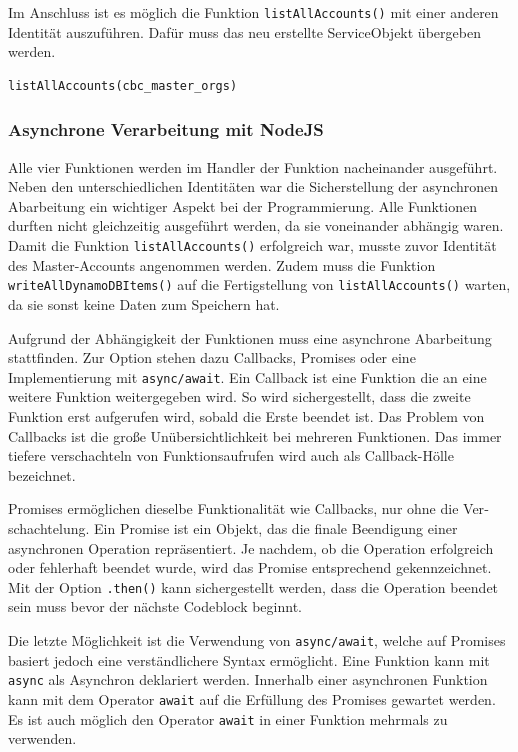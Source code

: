 Im Anschluss ist es möglich die Funktion \verb+listAllAccounts()+ mit einer anderen Identität auszuführen.
Dafür muss das neu erstellte ServiceObjekt übergeben werden.

\begin{lstlisting}[basicstyle=\ttfamily\small, breaklines=true , frame = single, backgroundcolor=\color{lightgray} ]
listAllAccounts(cbc_master_orgs)
\end{lstlisting}

\subsubsection{Asynchrone Verarbeitung mit NodeJS}

Alle vier Funktionen werden im Handler der Funktion nacheinander ausgeführt.
Neben den unterschiedlichen Identitäten war die Sicherstellung der asynchronen Abarbeitung ein wichtiger Aspekt bei der Programmierung.
Alle Funktionen durften nicht gleichzeitig ausgeführt werden, da sie voneinander abhängig waren.
Damit die Funktion \verb+listAllAccounts()+ erfolgreich war, musste zuvor Identität des Master-Accounts angenommen werden.
Zudem muss die Funktion \verb+writeAllDynamoDBItems()+ auf die Fertigstellung von \verb+listAllAccounts()+ warten, da sie sonst keine Daten zum Speichern hat.

Aufgrund der Abhängigkeit der Funktionen muss eine asynchrone Abarbeitung stattfinden.
Zur Option stehen dazu Callbacks, Promises oder eine Implementierung mit \verb+async/await+.
Ein Callback ist eine Funktion die an eine weitere Funktion weitergegeben wird.
So wird sichergestellt, dass die zweite Funktion erst aufgerufen wird, sobald die Erste beendet ist.
Das Problem von Callbacks ist die große Unübersichtlichkeit bei mehreren Funktionen.
Das immer tiefere verschachteln von Funktionsaufrufen wird auch als \glqq Callback-Hölle\grqq{} bezeichnet.

Promises ermöglichen dieselbe Funktionalität wie Callbacks, nur ohne die Ver­schach­telung.
\glqq Ein Promise ist ein Objekt, das die finale Beendigung einer asynchronen Operation repräsentiert.
Je nachdem, ob die Operation erfolgreich oder fehlerhaft beendet wurde, wird das Promise entsprechend gekennzeichnet. \grqq{} \cite[]{Promises}
Mit der Option \verb+.then()+ kann sichergestellt werden, dass die Operation beendet sein muss bevor der nächste Codeblock beginnt.

Die letzte Möglichkeit ist die Verwendung von \verb+async/await+, welche auf Promises basiert jedoch eine verständlichere Syntax ermöglicht.
Eine Funktion kann mit \verb+async+ als Asynchron deklariert werden.
Innerhalb einer asynchronen Funktion kann mit dem Operator \verb+await+ auf die Erfüllung des Promises gewartet werden.
Es ist auch möglich den Operator \verb+await+ in einer Funktion mehrmals zu verwenden.

